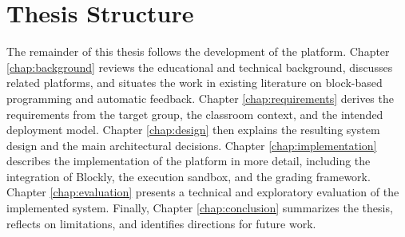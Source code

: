 \section{Thesis Structure}
The remainder of this thesis follows the development of the platform.
Chapter \ref{chap:background} reviews the educational and technical background, discusses related platforms, and situates the work in existing literature on block-based programming and automatic
feedback.
Chapter \ref{chap:requirements} derives the requirements from the target group, the classroom context, and the intended deployment model.
Chapter \ref{chap:design} then explains the resulting system design and the main architectural decisions.
Chapter \ref{chap:implementation} describes the implementation of the platform in more detail, including the integration of Blockly, the execution sandbox,
and the grading framework.
Chapter \ref{chap:evaluation} presents a technical and exploratory evaluation of the implemented system.
Finally, Chapter \ref{chap:conclusion} summarizes the thesis, reflects on limitations, and identifies directions for future work.
